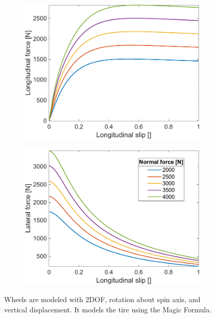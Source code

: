 \documentclass[a4paper, fleqn]{template/cas-dc}
\begin{document}
	\begin{figure}[ht]
		\centering
		\begin{subfigure}[b]{0.48\columnwidth}
			\centering
			\includegraphics[width=\linewidth]{figures/LongitudinalForce_slip.pdf}
		\end{subfigure}
		\begin{subfigure}[b]{0.48\columnwidth}
			\centering
			\includegraphics[width=\linewidth]{figures/LateralForce_slip.pdf}
		\end{subfigure}
		\caption{Wheels are modeled with 2DOF, rotation about spin axis, and vertical displacement. It models the tire using the Magic Formula.\cite{pacejka2005tire}}
		\label{FIG:WheelSlips}
	\end{figure}
			
\end{document}
